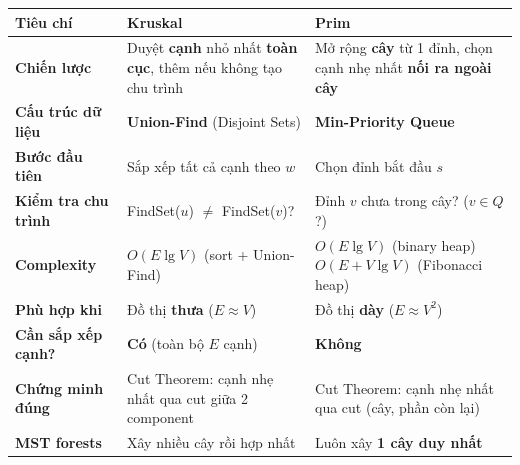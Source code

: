 \documentclass[10pt]{article}
\begin{document}
\begin{center}
\renewcommand{\arraystretch}{1.4}
\begin{tabular}{|p{3.2cm}|p{5.5cm}|p{5.5cm}|}
\hline
\textbf{Tiêu chí} & \textbf{Kruskal} & \textbf{Prim} \\
\hline
\textbf{Chiến lược} & Duyệt \textbf{cạnh} nhỏ nhất \textbf{toàn cục}, thêm nếu không tạo chu trình & Mở rộng \textbf{cây} từ 1 đỉnh, chọn cạnh nhẹ nhất \textbf{nối ra ngoài cây} \\
\hline
\textbf{Cấu trúc dữ liệu} & \textbf{Union-Find} (Disjoint Sets) & \textbf{Min-Priority Queue} \\
\hline
\textbf{Bước đầu tiên} & Sắp xếp tất cả cạnh theo $w$ & Chọn đỉnh bắt đầu $s$ \\
\hline
\textbf{Kiểm tra chu trình} & FindSet($u$) $\neq$ FindSet($v$)? & Đỉnh $v$ chưa trong cây? ($v \in Q$?) \\
\hline
\textbf{Complexity} & $O(E \lg V)$ (sort + Union-Find) & $O(E \lg V)$ (binary heap) \newline $O(E + V \lg V)$ (Fibonacci heap) \\
\hline
\textbf{Phù hợp khi} & Đồ thị \textbf{thưa} ($E \approx V$) & Đồ thị \textbf{dày} ($E \approx V^2$) \\
\hline
\textbf{Cần sắp xếp cạnh?} & \textbf{Có} (toàn bộ $E$ cạnh) & \textbf{Không} \\
\hline
\textbf{Chứng minh đúng} & Cut Theorem: cạnh nhẹ nhất qua cut giữa 2 component & Cut Theorem: cạnh nhẹ nhất qua cut (cây, phần còn lại) \\
\hline
\textbf{MST forests} & Xây nhiều cây rồi hợp nhất & Luôn xây \textbf{1 cây duy nhất} \\
\hline
\end{tabular}
\label{tab:kruskal-vs-prim}
\end{center}
\end{document}
